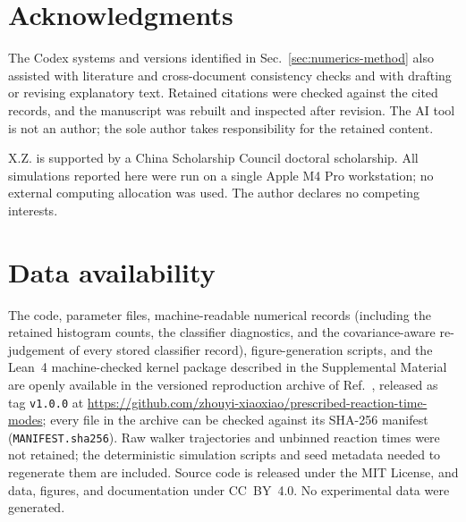 \documentclass[aps,physrev,reprint,amsmath,amssymb,longbibliography,floatfix]{revtex4-2}
\begin{document}
\section*{Acknowledgments}

The Codex systems and versions identified in Sec.~\ref{sec:numerics-method}
also assisted with
literature and cross-document consistency checks and with drafting or revising
explanatory text.  Retained citations were checked against the cited records,
and the manuscript was rebuilt and inspected after revision.  The AI tool is
not an author; the sole author takes responsibility for the retained content.

X.Z. is supported by a China Scholarship Council doctoral scholarship.  All
simulations reported here were run on a single Apple M4 Pro workstation; no
external computing allocation was used.  The author declares no competing
interests.

\section*{Data availability}

The code, parameter files, machine-readable numerical records (including
the retained histogram counts, the classifier diagnostics, and the
covariance-aware re-judgement of every stored classifier record),
figure-generation scripts, and the Lean~4 machine-checked kernel package
described in the Supplemental Material are openly available in the
versioned reproduction archive of Ref.~\cite{zhouyi2026reproduction},
released as tag \texttt{v1.0.0} at
\url{https://github.com/zhouyi-xiaoxiao/prescribed-reaction-time-modes};
every file in the archive can be checked against its SHA-256 manifest
(\texttt{MANIFEST.sha256}).  Raw walker trajectories and unbinned reaction
times were not retained; the deterministic simulation scripts and seed
metadata needed to regenerate them are included.  Source code is released
under the MIT License, and data, figures, and documentation under
CC~BY~4.0.  No experimental data were generated.


\end{document}
